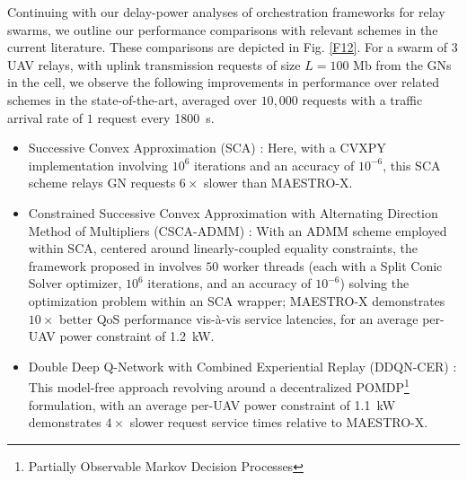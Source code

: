 \documentclass[12pt, draftcls, onecolumn]{IEEEtran}
\theoremstyle{plain}
\theoremstyle{definition}
\theoremstyle{remark}
\begin{document}
Continuing with our delay-power analyses of orchestration frameworks for relay swarms, we outline our performance comparisons with relevant schemes in the current literature. These comparisons are depicted in Fig. \ref{F12}. For a swarm of $3$ UAV relays, with uplink transmission requests of size $L=100$ Mb from the GNs in the cell, we observe the following improvements in performance over related schemes in the state-of-the-art, averaged over $10,000$ requests with a traffic arrival rate of $1$ request every \qty[mode=text]{1800}{\second}.
\begin{itemize}
    \item Successive Convex Approximation (SCA) \cite{SCA}: Here, with a CVXPY implementation involving $10^{6}$ iterations and an accuracy of $10^{-6}$, this SCA scheme relays GN requests $6{\times}$ slower than MAESTRO-X.
    \item Constrained Successive Convex Approximation with Alternating Direction Method of Multipliers (CSCA-ADMM) \cite{CSCA-ADMM}: With an ADMM scheme employed within SCA, centered around linearly-coupled equality constraints, the framework proposed in \cite{CSCA-ADMM} involves $50$ worker threads (each with a Split Conic Solver optimizer, $10^{6}$ iterations, and an accuracy of $10^{-6}$) solving the optimization problem within an SCA wrapper; MAESTRO-X demonstrates $10{\times}$ better QoS performance vis-à-vis service latencies, for an average per-UAV power constraint of \qty[mode=text]{1.2}{\kilo\watt}.
    \item Double Deep Q-Network with Combined Experiential Replay (DDQN-CER) \cite{DDQN}: This model-free approach revolving around a decentralized POMDP\footnote{Partially Observable Markov Decision Processes} formulation, with an average per-UAV power constraint of \qty[mode=text]{1.1}{\kilo\watt} demonstrates $4{\times}$ slower request service times relative to MAESTRO-X.
\end{itemize}
\end{document}
